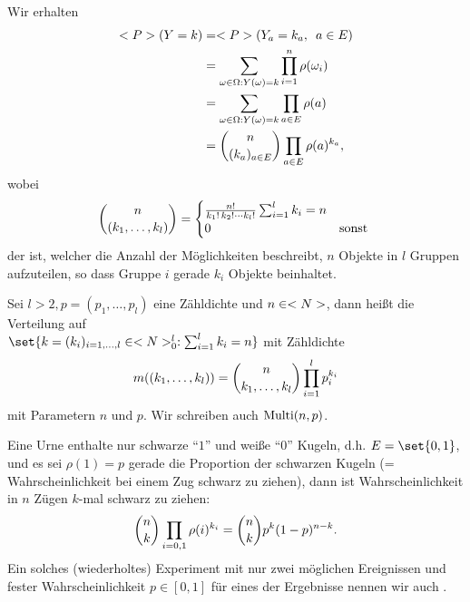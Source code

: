 
Wir erhalten
\begin{align*}
	<P>(Y = k) &= <P>(Y_a = k_a, \enskip a \in E)\notag\\
	&= \sum_{\omega \in \Omega: Y(\omega) = k} \prod_{i=1}^{n} \rho(\omega_i)\notag\\
	&= \sum_{\omega \in \Omega: Y(\omega) = k} \prod_{a \in E} \rho(a)\\ 
	&= \binom{n}{(k_a)_{a\in E}} 
	\prod_{a \in E} \rho(a)^{k_a},
	\end{align*}
	wobei
	\begin{align*}
	\binom{n}{(k_1, \dots, k_l)} = 
	\begin{cases}
	\frac{n!}{k_1 ! \, k_2 ! \cdots k_l !} \sum_{i=1}^{l} k_i = n & \\
	0 & \text{sonst }
	\end{cases}
\end{align*}
der  ist, welcher die Anzahl der Möglichkeiten beschreibt, $n$ Objekte in $l$ Gruppen aufzuteilen, so dass Gruppe $i$ gerade $k_i$ Objekte beinhaltet.
\begin{definition}[Multinomialverteilung]
	Sei $l > 2, p = (p_1, \dots, p_l)$ eine Zähldichte und $n \in <N>$, dann heißt die Verteilung auf \\
	$\set{k = (k_i)_{i=1,\dots,l} \in \N_{0}^{l} : \sum_{i=1}^{l} k_i = n}$ mit Zähldichte
	\begin{align}
		m((k_1,\dots,k_l)) = \binom{n}{k_1, \dots, k_l}\prod_{i=1}^{l} p_i^{k_i}\notag
	\end{align}
	 mit Parametern $n$ und $p$. Wir schreiben auch $\operatorname{Multi}(n,p)$.
\end{definition}
\begin{example}
	Eine Urne enthalte nur schwarze ``$1$'' und weiße ``$0$'' Kugeln, d.h. $E=\set{0,1}$, und es sei $\rho(1) = p$ gerade die Proportion der schwarzen Kugeln (= Wahrscheinlichkeit bei einem Zug schwarz zu ziehen), dann ist Wahrscheinlichkeit in $n$ Zügen $k$-mal schwarz zu ziehen:
	\begin{align}
		\binom{n}{k}\prod_{i=0,1} \rho(i)^{k_i} = \binom{n}{k} p^k (1-p)^{n-k}.\notag
	\end{align}
	Ein solches (wiederholtes) Experiment mit nur zwei möglichen Ereignissen und fester Wahrscheinlichkeit $p \in [0,1]$ für eines der Ergebnisse nennen wir auch .
\end{example}

